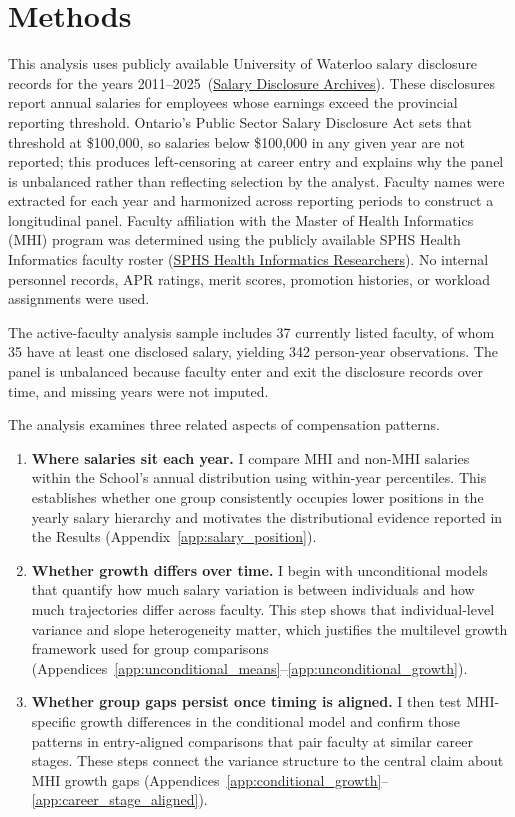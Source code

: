 \documentclass{article}
\newcommand{\DataMinYear}{2011}
\newcommand{\DataMaxYear}{2025}
\begin{document}
\section*{Methods}

This analysis uses publicly available University of Waterloo salary disclosure records for the years \DataMinYear--\DataMaxYear\ (\href{https://uwaterloo.ca/about/accountability/salary-disclosure}{Salary Disclosure Archives}). These disclosures report annual salaries for employees whose earnings exceed the provincial reporting threshold. Ontario's Public Sector Salary Disclosure Act sets that threshold at \$100{,}000, so salaries below \$100{,}000 in any given year are not reported; this produces left-censoring at career entry and explains why the panel is unbalanced rather than reflecting selection by the analyst. Faculty names were extracted for each year and harmonized across reporting periods to construct a longitudinal panel. Faculty affiliation with the Master of Health Informatics (MHI) program was determined using the publicly available SPHS Health Informatics faculty roster (\href{https://uwaterloo.ca/public-health-sciences/our-people/health-informatics-researchers}{SPHS Health Informatics Researchers}). No internal personnel records, APR ratings, merit scores, promotion histories, or workload assignments were used.

The active-faculty analysis sample includes 37 currently listed faculty, of whom 35 have at least one disclosed salary, yielding 342 person-year observations. The panel is unbalanced because faculty enter and exit the disclosure records over time, and missing years were not imputed.

The analysis examines three related aspects of compensation patterns.

\begin{enumerate}
    \item \textbf{Where salaries sit each year.} I compare MHI and non-MHI salaries within the School’s annual distribution using within-year percentiles. This establishes whether one group consistently occupies lower positions in the yearly salary hierarchy and motivates the distributional evidence reported in the Results (Appendix~\ref{app:salary_position}).
    \item \textbf{Whether growth differs over time.} I begin with unconditional models that quantify how much salary variation is between individuals and how much trajectories differ across faculty. This step shows that individual-level variance and slope heterogeneity matter, which justifies the multilevel growth framework used for group comparisons (Appendices~\ref{app:unconditional_means}--\ref{app:unconditional_growth}).
    \item \textbf{Whether group gaps persist once timing is aligned.} I then test MHI-specific growth differences in the conditional model and confirm those patterns in entry-aligned comparisons that pair faculty at similar career stages. These steps connect the variance structure to the central claim about MHI growth gaps (Appendices~\ref{app:conditional_growth}--\ref{app:career_stage_aligned}).
\end{enumerate}
\end{document}
